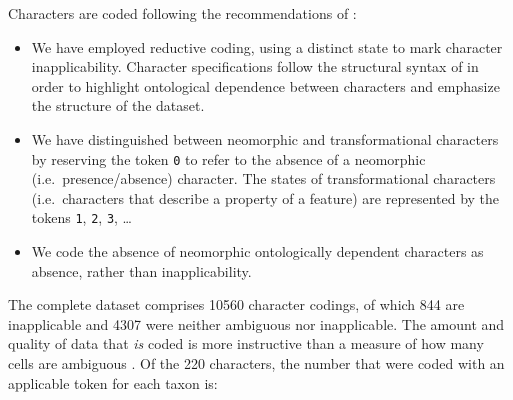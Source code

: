 \documentclass[openany]{book}
\theoremstyle{definition}
\theoremstyle{definition}
\theoremstyle{definition}
\theoremstyle{remark}
\begin{document}
Characters are coded following the recommendations of
\citet{Brazeau2018}:

\begin{itemize}
\item
  We have employed reductive coding, using a distinct state to mark
  character inapplicability. Character specifications follow the
  structural syntax of \citet{Sereno2007} in order to highlight
  ontological dependence between characters and emphasize the structure
  of the dataset.
\item
  We have distinguished between neomorphic and transformational
  characters \citep[sensu][]{Sereno2007} by reserving the token
  \texttt{0} to refer to the absence of a neomorphic
  (i.e.~presence/absence) character. The states of transformational
  characters (i.e.~characters that describe a property of a feature) are
  represented by the tokens \texttt{1}, \texttt{2}, \texttt{3}, \ldots{}
\item
  We code the absence of neomorphic ontologically dependent characters
  \citep[sensu][]{Vogt2017} as absence, rather than inapplicability.
\end{itemize}

The complete dataset comprises 10560 character codings, of which 844 are
inapplicable and 4307 were neither ambiguous nor inapplicable. The
amount and quality of data that \emph{is} coded is more instructive than
a measure of how many cells are ambiguous \citep{Wiens1998, Wiens2003}.
Of the 220 characters, the number that were coded with an applicable
token for each taxon is:
\end{document}
